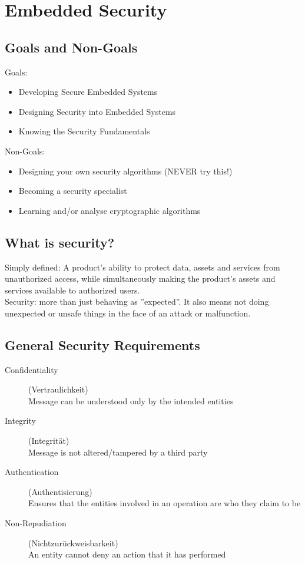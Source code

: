 \section{Embedded Security}

\subsection{Goals and Non-Goals}
\begin{multicols}{2}
  Goals:
  \begin{itemize}
    \item Developing Secure Embedded Systems
    \item Designing Security into Embedded Systems
    \item Knowing the Security Fundamentals
  \end{itemize}
  \vfill\null
  \columnbreak
  Non-Goals:
  \begin{itemize}
    \item Designing your own security algorithms (NEVER try this!)
    \item Becoming a security specialist
    \item Learning and/or analyse cryptographic algorithms
  \end{itemize}
\end{multicols}

\subsection{What is security?}
Simply defined: A product's ability to protect data, assets and services from unauthorized access, while simultaneously making the product's assets and services available to authorized users.\\

Security: more than just behaving as ''expected''. It also means not doing unexpected or unsafe things in the face of an attack or malfunction.

\subsection{General Security Requirements}
\begin{description}
  \item[Confidentiality] (Vertraulichkeit)\\ Message can be understood only by the intended entities
  \item[Integrity] (Integrität)\\ Message is not altered/tampered by a third party
  \item[Authentication] (Authentisierung)\\ Ensures that the entities involved in an operation are who they claim to be
  \item[Non-Repudiation] (Nichtzurückweisbarkeit)\\ An entity cannot deny an action that it has performed
\end{description}

